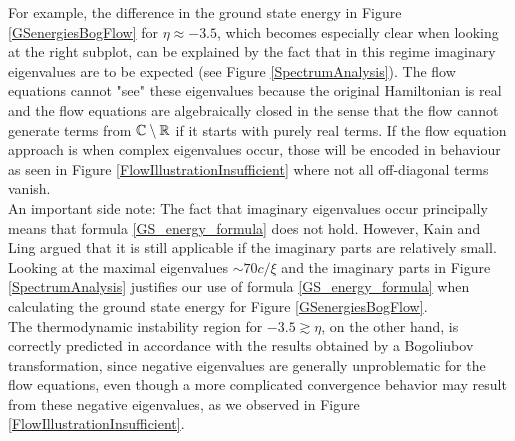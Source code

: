 For example, the difference in the ground state energy in Figure \ref{GSenergiesBogFlow} for $\eta\approx -3.5$, which becomes especially clear when looking at the right subplot, can be explained by the fact that in this regime imaginary eigenvalues are to be expected (see Figure \ref{SpectrumAnalysis}). The flow equations cannot "see" these eigenvalues because the original Hamiltonian is real and the flow equations are algebraically closed in the sense that the flow cannot generate terms from $\mathbb{C}\setminus \mathbb{R}$ if it starts with purely real terms. If the flow equation approach is when complex eigenvalues occur, those will be encoded in behaviour as seen in Figure \ref{FlowIllustrationInsufficient} where not all off-diagonal terms vanish. \\
An important side note: The fact that imaginary eigenvalues occur principally means that formula \ref{GS_energy_formula} does not hold. However, Kain and Ling \cite{PhysRevA.98.033610} argued that it is still applicable if the imaginary parts are relatively small. Looking at the maximal eigenvalues $\sim 70c/\xi$ and the imaginary parts in Figure \ref{SpectrumAnalysis} justifies our use of formula \ref{GS_energy_formula} when calculating the ground state energy for Figure \ref{GSenergiesBogFlow}.\\
The thermodynamic instability region for $-3.5\gtrsim\eta$, on the other hand, is correctly predicted in accordance with the results obtained by a Bogoliubov transformation, since negative eigenvalues are generally unproblematic for the flow equations, even though a more complicated convergence behavior may result from these negative eigenvalues, as we observed in Figure \ref{FlowIllustrationInsufficient}.


